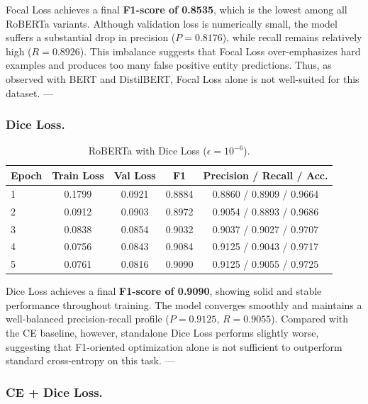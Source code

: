 Focal Loss achieves a final \textbf{F1-score of 0.8535}, which is the lowest among all RoBERTa variants.
Although validation loss is numerically small, the model suffers a substantial drop in precision ($P = 0.8176$), while recall remains relatively high ($R = 0.8926$).
This imbalance suggests that Focal Loss over-emphasizes hard examples and produces too many false positive entity predictions.
Thus, as observed with BERT and DistilBERT, Focal Loss alone is not well-suited for this dataset.
---

\subsubsection{Dice Loss.}

\begin{table}[H]
\centering
\caption{RoBERTa with Dice Loss ($\epsilon = 10^{-6}$).}
\begin{tabular}{lcccc}
\hline
\textbf{Epoch} & \textbf{Train Loss} & \textbf{Val Loss} & \textbf{F1} & \textbf{Precision} / \textbf{Recall} / \textbf{Acc.} \\
\hline
1 & 0.1799 & 0.0921 & 0.8884 & 0.8860 / 0.8909 / 0.9664 \\
2 & 0.0912 & 0.0903 & 0.8972 & 0.9054 / 0.8893 / 0.9686 \\
3 & 0.0838 & 0.0854 & 0.9032 & 0.9037 / 0.9027 / 0.9707 \\
4 & 0.0756 & 0.0843 & 0.9084 & 0.9125 / 0.9043 / 0.9717 \\
5 & 0.0761 & 0.0816 & 0.9090 & 0.9125 / 0.9055 / 0.9725 \\
\hline
\end{tabular}
\label{tab:roberta_dice}
\end{table}

Dice Loss achieves a final \textbf{F1-score of 0.9090}, showing solid and stable performance throughout training.
The model converges smoothly and maintains a well-balanced precision-recall profile ($P = 0.9125$, $R = 0.9055$).
Compared with the CE baseline, however, standalone Dice Loss performs slightly worse, suggesting that F1-oriented optimization alone is not sufficient to outperform standard cross-entropy on this task.
---

\subsubsection{CE + Dice Loss.}

